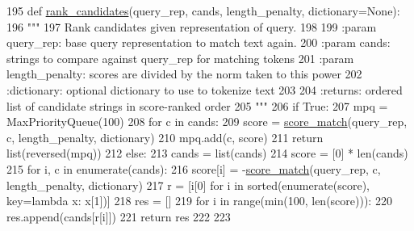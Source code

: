 \begin{DoxyCode}
195 \textcolor{keyword}{def }\hyperlink{namespaceparlai_1_1agents_1_1ir__baseline_1_1ir__baseline_a995475fdd96a7bbd8886a3ebcfa56156}{rank\_candidates}(query\_rep, cands, length\_penalty, dictionary=None):
196     \textcolor{stringliteral}{"""}
197 \textcolor{stringliteral}{    Rank candidates given representation of query.}
198 \textcolor{stringliteral}{}
199 \textcolor{stringliteral}{    :param query\_rep: base query representation to match text again.}
200 \textcolor{stringliteral}{    :param cands: strings to compare against query\_rep for matching tokens}
201 \textcolor{stringliteral}{    :param length\_penalty: scores are divided by the norm taken to this power}
202 \textcolor{stringliteral}{    :dictionary: optional dictionary to use to tokenize text}
203 \textcolor{stringliteral}{}
204 \textcolor{stringliteral}{    :returns: ordered list of candidate strings in score-ranked order}
205 \textcolor{stringliteral}{    """}
206     \textcolor{keywordflow}{if} \textcolor{keyword}{True}:
207         mpq = MaxPriorityQueue(100)
208         \textcolor{keywordflow}{for} c \textcolor{keywordflow}{in} cands:
209             score = \hyperlink{namespaceparlai_1_1agents_1_1ir__baseline_1_1ir__baseline_a64aaaccb38f5dd5f51c09439456b2f6e}{score\_match}(query\_rep, c, length\_penalty, dictionary)
210             mpq.add(c, score)
211         \textcolor{keywordflow}{return} list(reversed(mpq))
212     \textcolor{keywordflow}{else}:
213         cands = list(cands)
214         score = [0] * len(cands)
215         \textcolor{keywordflow}{for} i, c \textcolor{keywordflow}{in} enumerate(cands):
216             score[i] = -\hyperlink{namespaceparlai_1_1agents_1_1ir__baseline_1_1ir__baseline_a64aaaccb38f5dd5f51c09439456b2f6e}{score\_match}(query\_rep, c, length\_penalty, dictionary)
217         r = [i[0] \textcolor{keywordflow}{for} i \textcolor{keywordflow}{in} sorted(enumerate(score), key=\textcolor{keyword}{lambda} x: x[1])]
218         res = []
219         \textcolor{keywordflow}{for} i \textcolor{keywordflow}{in} range(min(100, len(score))):
220             res.append(cands[r[i]])
221         \textcolor{keywordflow}{return} res
222 
223 
\end{DoxyCode}
\mbox{\label{namespaceparlai_1_1agents_1_1ir__baseline_1_1ir__baseline_a64aaaccb38f5dd5f51c09439456b2f6e}} 
